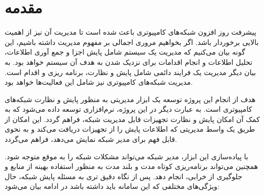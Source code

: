\chapter{مقدمه}

پیشرفت روز افزون شبکه‌های کامپیوتری باعث شده است تا مدیریت آن نیز از اهمیت بالایی برخوردار باشد. اگر بخواهیم مروری اجمالی بر مفهوم مدیریت داشته باشیم، این گونه بیان می‌کنیم که مدیریت یک سیستم شامل پایش اجزا و جمع آوری اطلاعات، تحلیل اطلاعات و انجام اقدامات برای نزدیک شدن به هدف آن سیستم خواهد بود. به بیان دیگر مدیریت یک فرایند دائمی شامل پایش و نظارت، برنامه ریزی و اقدام است. مدیریت شبکه‌های کامپیوتری نیز شامل این فعالیت‌ها خواهد بود.

هدف از انجام این پروژه توسعه یک ابزار مدیریتی به منظور پایش و نظارت شبکه‌های کامپیوتری است. به عبارت دیگر در این پروژه، نرم‌افزاری توسعه داده می‌شود که به کمک آن امکان پایش و نظارت تجهیزات قابل مدیریت شبکه، فراهم گردد. این امکان از طریق یک واسط مدیریتی که اطلاعات پایش را از تجهیزات دریافت می‌کند و به نحوی قابل فهم برای مدیر شبکه نمایش می‌دهد، فراهم می‌گردد.

با پیاده‌سازی این ابزار، مدیر شبکه می‌تواند مشکلات شبکه را به موقع متوجه شود. همچنین می‌تواند برنامه‌ریزی کوتاه مدت و بلند مدت به منظور استفاده بهینه از منابع و جلوگیری از خرابی، انجام دهد. پس از نگاه دقیق تری به مسئله پایش شبکه، حال ویژگی‌های مختلفی که این سامانه باید داشته باشد در ادامه بیان می‌شود:

